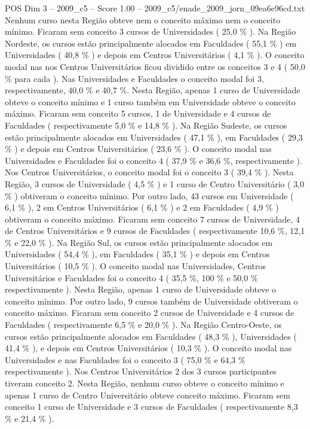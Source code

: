 \begin{textsample}{POS Dim 3 – 2009\_c5 – Score 1.00 – 2009\_c5/enade\_2009\_jorn\_09ea6e96cd.txt}
Nenhum curso nesta Região obteve nem o conceito máximo nem o conceito mínimo.
Ficaram sem conceito 3 cursos de Universidades ( 25,0 \% ).
Na Região Nordeste, os cursos estão principalmente alocados em Faculdades ( 55,1 \% ) em Universidades ( 40,8 \% ) e depois em Centros Universitários ( 4,1 \% ).
O conceito modal nas nos Centros Universitários ficou dividido entre os conceitos 3 e 4 ( 50,0 \% para cada ).
Nas Universidades e Faculdades o conceito modal foi 3, respectivamente, 40,0 \% e 40,7 \%.
Nesta Região, apenas 1 curso de Universidade obteve o conceito mínimo e 1 curso também em Universidade obteve o conceito máximo.
Ficaram sem conceito 5 cursos, 1 de Universidade e 4 cursos de Faculdades ( respectivamente 5,0 \% e 14,8 \% ).
Na Região Sudeste, os cursos estão principalmente alocados em Universidades ( 47,1 \% ), em Faculdades ( 29,3 \% ) e depois em Centros Universitários ( 23,6 \% ).
O conceito modal nas Universidades e Faculdades foi o conceito 4 ( 37,9 \% e 36,6 \%, respectivamente ).
Nos Centros Universitários, o conceito modal foi o conceito 3 ( 39,4 \% ).
Nesta Região, 3 cursos de Universidade ( 4,5 \% ) e 1 curso de Centro Universitário ( 3,0 \% ) obtiveram o conceito mínimo.
Por outro lado, 43 cursos em Universidade ( 6,1 \% ), 2 em Centros Universitários ( 6,1 \% ) e 2 em Faculdades ( 4,9 \% ) obtiveram o conceito máximo.
Ficaram sem conceito 7 cursos de Universidade, 4 de Centros Universitários e 9 cursos de Faculdades ( respectivamente 10,6 \%, 12,1 \% e 22,0 \% ).
Na Região Sul, os cursos estão principalmente alocados em Universidades ( 54,4 \% ), em Faculdades ( 35,1 \% ) e depois em Centros Universitários ( 10,5 \% ).
O conceito modal nas Universidades, Centros Universitários e Faculdades foi o conceito 4 ( 35,5 \%, 100 \% e 50,0 \% respectivamente ).
Nesta Região, apenas 1 curso de Universidade obteve o conceito mínimo.
Por outro lado, 9 cursos também de Universidade obtiveram o conceito máximo.
Ficaram sem conceito 2 cursos de Universidade e 4 cursos de Faculdades ( respectivamente 6,5 \% e 20,0 \% ).
Na Região Centro-Oeste, os cursos estão principalmente alocados em Faculdades ( 48,3 \% ), Universidades ( 41,4 \% ), e depois em Centros Universitários ( 10,3 \% ).
O conceito modal nas Universidades e nas Faculdades foi o conceito 3 ( 75,0 \% e 64,3 \% respectivamente ).
Nos Centros Universitários 2 dos 3 cursos participantes tiveram conceito 2.
Nesta Região, nenhum curso obteve o conceito mínimo e apenas 1 curso de Centro Universitário obteve conceito máximo.
Ficaram sem conceito 1 curso de Universidade e 3 cursos de Faculdades ( respectivamente 8,3 \% e 21,4 \% ).

\end{textsample}
